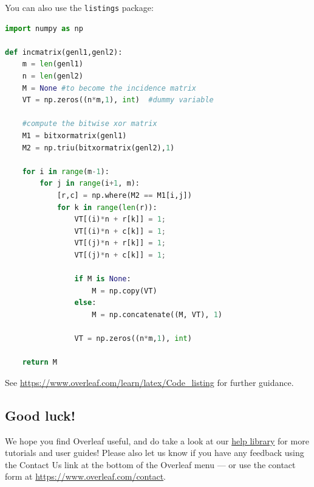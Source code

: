 \documentclass{article}
\begin{document}
You can also use the \texttt{listings} package:
\begin{lstlisting}[language=Python, caption=Python example]
import numpy as np
    
def incmatrix(genl1,genl2):
    m = len(genl1)
    n = len(genl2)
    M = None #to become the incidence matrix
    VT = np.zeros((n*m,1), int)  #dummy variable
    
    #compute the bitwise xor matrix
    M1 = bitxormatrix(genl1)
    M2 = np.triu(bitxormatrix(genl2),1) 

    for i in range(m-1):
        for j in range(i+1, m):
            [r,c] = np.where(M2 == M1[i,j])
            for k in range(len(r)):
                VT[(i)*n + r[k]] = 1;
                VT[(i)*n + c[k]] = 1;
                VT[(j)*n + r[k]] = 1;
                VT[(j)*n + c[k]] = 1;
                
                if M is None:
                    M = np.copy(VT)
                else:
                    M = np.concatenate((M, VT), 1)
                
                VT = np.zeros((n*m,1), int)
    
    return M
\end{lstlisting}

See \url{https://www.overleaf.com/learn/latex/Code_listing} for further guidance.

\subsection{Good luck!}

We hope you find Overleaf useful, and do take a look at our \href{https://www.overleaf.com/learn}{help library} for more tutorials and user guides! Please also let us know if you have any feedback using the Contact Us link at the bottom of the Overleaf menu --- or use the contact form at \url{https://www.overleaf.com/contact}.



\end{document}
